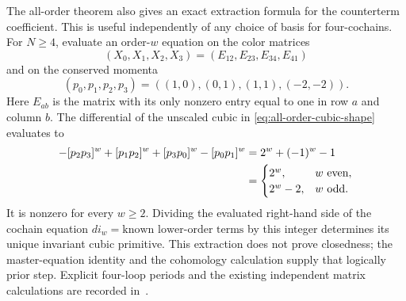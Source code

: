 The all-order theorem also gives an exact extraction formula for the
counterterm coefficient.  This is useful independently of any
choice of basis for four-cochains.  For $N\ge4$, evaluate an
order-$w$ equation on the color matrices
\begin{equation}
  (X_0,X_1,X_2,X_3)=(E_{12},E_{23},E_{34},E_{41})
\end{equation}
and on the conserved momenta
\begin{equation}
  (p_0,p_1,p_2,p_3)=((1,0),(0,1),(1,1),(-2,-2)).
\end{equation}
Here $E_{ab}$ is the matrix with its only nonzero entry equal to one
in row $a$ and column $b$.  The differential of the unscaled cubic
in \eqref{eq:all-order-cubic-shape} evaluates to
\begin{align}
 -[p_2p_3]^w+[p_1p_2]^w+[p_3p_0]^w-[p_0p_1]^w
   &=2^w+(-1)^w-1\notag\\
   &=\begin{cases}2^w,&w\text{ even},\\
                    2^w-2,&w\text{ odd}.
      \end{cases}
 \label{eq:all-order-extraction-denominator}
\end{align}
It is nonzero for every $w\ge2$.  Dividing the evaluated right-hand
side of the cochain equation $d i_w=\text{known lower-order terms}$
by this integer determines its unique invariant cubic primitive.
This extraction does not prove closedness; the master-equation
identity and the cohomology calculation supply that logically prior
step.  Explicit four-loop periods and the existing independent
matrix calculations are recorded in~\cite{RepoHigher}.
